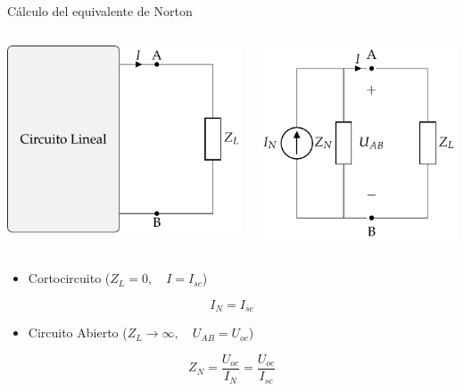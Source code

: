 \documentclass[aspectratio=169, usenames,svgnames,dvipsnames]{beamer}
\begin{document}
\begin{frame}[label={sec:orgb8d7433}]{Cálculo del equivalente de Norton}
\begin{columns}
\begin{column}{0.5\columnwidth}
\begin{center}
\includegraphics[height=0.38\textheight]{../figs/CircuitoLineal_ZL.pdf}
\end{center}
\end{column}

\begin{column}{0.5\columnwidth}
\begin{center}
\includegraphics[height=0.38\textheight]{../figs/EquivalenteNorton.pdf}
\end{center}
\end{column}
\end{columns}

\begin{itemize}
\item Cortocircuito (\(Z_L = 0, \quad I = I_{sc}\))
\end{itemize}
\[
\boxed{I_N = I_{sc}}
\]
\begin{itemize}
\item Circuito Abierto (\(Z_L \to \infty, \quad U_{AB} = U_{oc}\))
\end{itemize}
\[
\boxed{Z_N = \frac{U_{oc}}{I_N} = \frac{U_{oc}}{I_{sc}}}
\]
\end{frame}
\end{document}
